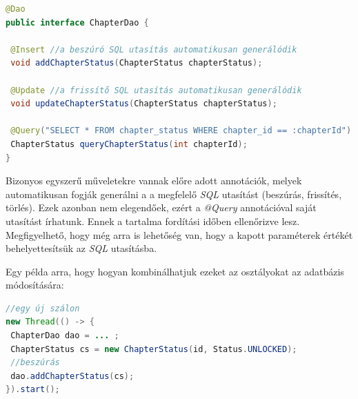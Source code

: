 \documentclass[12pt,a4paper]{article}
\begin{document}
	\begin{lstlisting}[language=Java]
@Dao
public interface ChapterDao {
	
 @Insert //a beszúró SQL utasítás automatikusan generálódik
 void addChapterStatus(ChapterStatus chapterStatus);
	
 @Update //a frissítő SQL utasítás automatikusan generálódik
 void updateChapterStatus(ChapterStatus chapterStatus);
	
 @Query("SELECT * FROM chapter_status WHERE chapter_id == :chapterId")
 ChapterStatus queryChapterStatus(int chapterId);
}
	\end{lstlisting}

	Bizonyos egyszerű műveletekre vannak előre adott annotációk, melyek automatikusan fogják generálni a a megfelelő \textit{SQL} utasítást (beszúrás, frissítés, törlés). Ezek azonban nem elegendőek, ezért a \textit{@Query} annotációval saját utasítást írhatunk. Ennek a tartalma fordítási időben ellenőrizve lesz. Megfigyelhető, hogy még arra is lehetőség van, hogy a kapott paraméterek értékét behelyettesítsük az \textit{SQL} utasításba.

	Egy példa arra, hogy hogyan kombinálhatjuk ezeket az osztályokat az adatbázis módosítására:
	
	\begin{lstlisting}[language=Java]
//egy új szálon
new Thread(() -> {
 ChapterDao dao = ... ;
 ChapterStatus cs = new ChapterStatus(id, Status.UNLOCKED);
 //beszúrás
 dao.addChapterStatus(cs);
}).start();
	\end{lstlisting}
\end{document}
